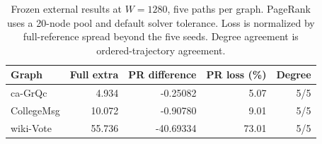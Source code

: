 \begin{table}[htbp]
\caption{Frozen external results at $W=1280$, five paths per graph. PageRank uses a 20-node pool and default solver tolerance. Loss is normalized by full-reference spread beyond the five seeds. Degree agreement is ordered-trajectory agreement.}\label{tab:primary}
\begin{tabular}{lrrrr}
\toprule
Graph & Full extra & PR difference & PR loss (\%) & Degree \\
\midrule
ca-GrQc & 4.934 & -0.25082 & 5.07 & 5/5 \\
CollegeMsg & 10.072 & -0.90780 & 9.01 & 5/5 \\
wiki-Vote & 55.736 & -40.69334 & 73.01 & 5/5 \\
\bottomrule
\end{tabular}
\end{table}
